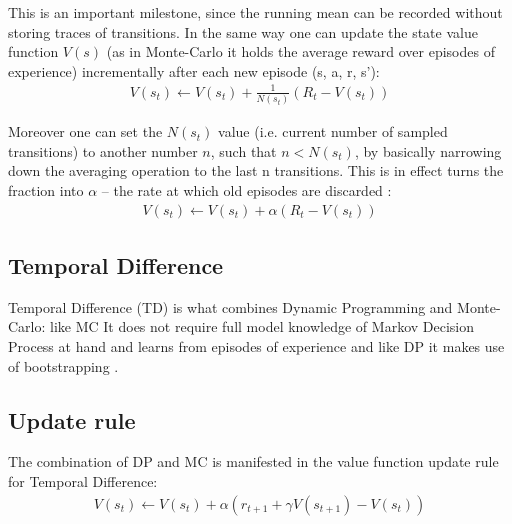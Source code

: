 This is an important milestone, since the running mean can be recorded without storing traces of transitions. In the same way one can update the state value function $V(s)$ (as in Monte-Carlo it holds the average reward over episodes of experience) incrementally after each new episode (s, a, r, s'):
\begin{align}
    V(s_t) \longleftarrow V(s_t) + \frac{1}{N(s_t)}(R_t - V(s_t))
\end{align}

Moreover one can set the $N(s_t)$ value (i.e. current number of sampled transitions) to another number $n$, such that $n < N(s_t)$, by basically narrowing down the averaging operation to the last n transitions. This is in effect turns the fraction into $\alpha$ -- the rate at which old episodes are discarded \cite{lecture_mfl}:
\begin{align}
    V(s_t) \longleftarrow V(s_t) + \alpha (R_t - V(s_t)) \label{eq:mc_increment}
\end{align}

\subsection{Temporal Difference}

Temporal Difference (TD) is what combines Dynamic Programming and Monte-Carlo: like MC It does not require full model knowledge of Markov Decision Process at hand and 
learns from episodes of experience and like DP it makes use of bootstrapping \cite{lecture_mfl}.


\subsection{Update rule}
The combination of DP and MC is manifested in the value function update rule for Temporal Difference:
\begin{align}
  V(s_t) \longleftarrow V(s_t) + \alpha (r_{t+1} + \gamma V(s_{t+1}) - V(s_t)) \label{eq:td_update}
\end{align}

